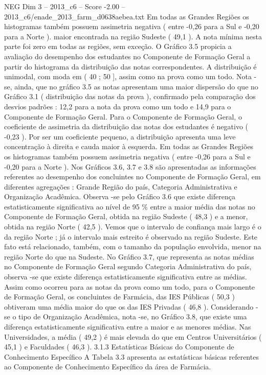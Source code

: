 \begin{textsample}{NEG Dim 3 – 2013\_c6 – Score -2.00 – 2013\_c6/enade\_2013\_farm\_d0638aebea.txt}
Em todas as Grandes Regiões os histogramas também possuem assimetria negativa ( entre -0,26 para a Sul e -0,20 para a Norte ). maior encontrada na região Sudeste ( 49,1 ).
A nota mínima nesta parte foi zero em todas as regiões, sem exceção.
O Gráfico 3.5 propicia a avaliação do desempenho dos estudantes no Componente de Formação Geral a partir do histograma da distribuição das notas correspondentes.
A distribuição é unimodal, com moda em ( 40 ; 50 ], assim como na prova como um todo.
Nota -se, ainda, que no gráfico 3.5 as notas apresentam uma maior dispersão do que no Gráfico 3.1 ( distribuição das notas da prova ), confirmado pela comparação dos desvios padrões : 12,2 para a nota da prova como um todo e 14,9 para o Componente de Formação Geral.
Para o Componente de Formação Geral, o coeficiente de assimetria da distribuição das notas dos estudantes é negativo ( -0,23 ).
Por ser um coeficiente pequeno, a distribuição apresenta uma leve concentração à direita e cauda maior à esquerda.
Em todas as Grandes Regiões os histogramas também possuem assimetria negativa ( entre -0,26 para a Sul e -0,20 para a Norte ).
Nos Gráficos 3.6, 3.7 e 3.8 são apresentadas as informações referentes ao desempenho dos concluintes no Componente de Formação Geral, em diferentes agregações : Grande Região do país, Categoria Administrativa e Organização Acadêmica.
Observa -se pelo Gráfico 3.6 que existe diferença estatisticamente significativa ao nível de 95 \% entre a maior média das notas no Componente de Formação Geral, obtida na região Sudeste ( 48,3 ) e a menor, obtida na região Norte ( 42,5 ).
Vemos que o intervalo de confiança mais largo é o da região Norte ; já o intervalo mais estreito é observado na região Sudeste.
Este fato está relacionado, também, com o tamanho da população envolvida, menor na região Norte do que na Sudeste.
No Gráfico 3.7, que representa as notas médias no Componente de Formação Geral segundo Categoria Administrativa do país, observa -se que existe diferença estatisticamente significativa entre as médias.
Assim como ocorreu para as notas da prova como um todo, para o Componente de Formação Geral, os concluintes de Farmácia, das IES Públicas ( 50,3 ) obtiveram uma média maior do que os das IES Privadas ( 46,8 ).
Considerando -se o tipo de Organização Acadêmica, nota -se, no Gráfico 3.8, que existe uma diferença estatisticamente significativa entre a maior e as menores médias.
Nas Universidades, a média ( 49,2 ) é mais elevada do que em Centros Universitários ( 45,1 ) e Faculdades ( 46,3 ). 3.1.3 Estatísticas Básicas do Componente de Conhecimento Específico A Tabela 3.3 apresenta as estatísticas básicas referentes ao Componente de Conhecimento Específico da área de Farmácia.

\end{textsample}
